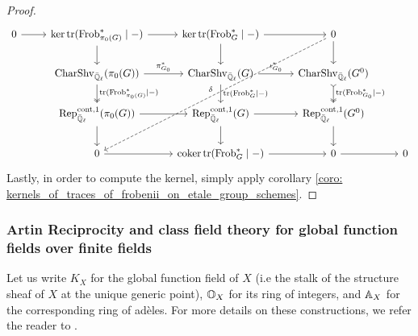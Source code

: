 \begin{proof}
                        $$
                            \begin{tikzcd}
                            	0 & {\ker \trace(\Frob^*_{\pi_0(G)} \mid -)} & {\ker \trace(\Frob^*_G \mid -)} & 0 \\
                            	& {\Char\Shv_{\bar{\Q}_{\ell}}(\pi_0(G))} & {\Char\Shv_{\bar{\Q}_{\ell}}(G)} & {\Char\Shv_{\bar{\Q}_{\ell}}(G^0)} \\
                            	& {\Rep^{\cont, 1}_{\bar{\Q}_{\ell}}(\pi_0(G))} & {\Rep^{\cont, 1}_{\bar{\Q}_{\ell}}(G)} & {\Rep^{\cont, 1}_{\bar{\Q}_{\ell}}(G^0)} \\
                            	& 0 & {\coker \trace(\Frob^*_G \mid -)} & 0 & 0
                            	\arrow["{\trace(\Frob^*_{\pi_0(G)} \mid -)}", two heads, from=2-2, to=3-2]
                            	\arrow["{\trace(\Frob^*_G \mid -)}", from=2-3, to=3-3]
                            	\arrow["{\trace(\Frob^*_{G_0} \mid -)}", tail, two heads, from=2-4, to=3-4]
                            	\arrow["{\pi_{G_0}^*}", from=2-2, to=2-3]
                            	\arrow["{\iota_{G_0}^*}", from=2-3, to=2-4]
                            	\arrow[from=3-2, to=3-3]
                            	\arrow[from=3-3, to=3-4]
                            	\arrow[from=1-1, to=1-2]
                            	\arrow[from=1-2, to=1-3]
                            	\arrow[from=1-3, to=1-4]
                            	\arrow["\delta"', dashed, from=1-4, to=4-2]
                            	\arrow[from=4-2, to=4-3]
                            	\arrow[from=4-3, to=4-4]
                            	\arrow[from=4-4, to=4-5]
                            	\arrow[from=1-4, to=2-4]
                            	\arrow[from=3-4, to=4-4]
                            	\arrow[from=3-2, to=4-2]
                            	\arrow[from=1-2, to=2-2]
                            	\arrow[from=1-3, to=2-3]
                            	\arrow[from=3-3, to=4-3]
                            \end{tikzcd}
                        $$
                    Lastly, in order to compute the kernel, simply apply corollary \ref{coro: kernels_of_traces_of_frobenii_on_etale_group_schemes}.
                \end{proof}
        
        \subsubsection{Artin Reciprocity and class field theory for global function fields over finite fields}
            \begin{convention} \label{conv: global_function_field}
                Let us write $K_X$ for the global function field of $X$ (i.e the stalk of the structure sheaf of $X$ at the unique generic point), $\mathbb{O}_X$ for its ring of integers, and $\mathbb{A}_X$ for the corresponding ring of ad\`eles. For more details on these constructions, we refer the reader to \cite[Section VI.1]{neukirch_2010_algebraic_number_theory}. 
            \end{convention}
            
